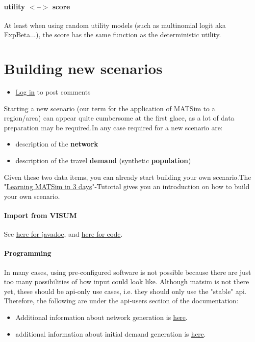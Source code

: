 \documentclass[a4paper,11pt]{report}
\begin{document}
\subsubsection{utility $<$--$>$ score}

At least when using random utility models (such as multinomial logit   aka ExpBeta...), the score has the same function as the deterministic   utility.

\chapter{Building new scenarios}
\begin{itemize}
	\item \href{http://www.matsim.org/user/login?destination=comment/reply/144%23comment-form}{Log in} to post comments
\end{itemize}

Starting  a new scenario (our term for the application of MATSim to a  region/area) can appear quite cumbersome at the first glace, as a lot of  data preparation may be required.In any case required for a new  scenario are:
\begin{itemize}
	\item description of the \textbf{network}
	\item description of the travel \textbf{demand} (synthetic \textbf{population})
\end{itemize}

Given these two data items, you can already start building your own scenario.The "\href{http://www.matsim.org/docs/tutorials/learningIn3days}{Learning MATSim in 3 days}"-Tutorial gives you an introduction on how to build your own scenario.

\subsubsection{Import from VISUM}

See \href{http://matsim.org/javadoc/org/matsim/visum/package-summary.html}{here for javadoc}, and \href{http://matsim.org/xref/org/matsim/visum/package-summary.html}{here for code}.

\subsubsection{Programming}

In many cases, using pre-configured software is not possible because  there are just too many possibilities of how input could look like.  Although matsim is not there yet, these should be api-only use cases,  i.e. they should only use the "stable" api. Therefore, the  following are under the api-users section of the documentation:
\begin{itemize}
	\item Additional information about network generation is \href{http://matsim.org/node/588}{here}.
	\item additional information about initial demand generation is \href{http://matsim.org/node/340}{here}.
\end{itemize}
\end{document}
